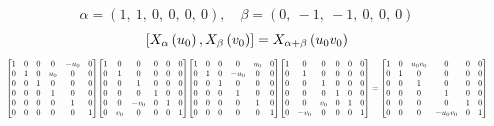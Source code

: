 \documentclass[11pt]{article}
\theoremstyle{definition}
\begin{document}
\[
\alpha = \left( 1, \  1, \  0, \  0, \  0, \  0\right), \quad \beta = \left( 0, \  -1, \  -1, \  0, \  0, \  0\right)
\]
\[
\scaletoalign{\textwidth}{\left[ X_{\alpha}\left(u_{0}\right), X_{\beta}\left(v_{0}\right) \right] = X_{\alpha + \beta}\left(u_{0} v_{0}\right)}
\]
\[
\scaletoalign{\textwidth}{{\left[\begin{matrix}1 & 0 & 0 & 0 & - u_{0} & 0\\0 & 1 & 0 & u_{0} & 0 & 0\\0 & 0 & 1 & 0 & 0 & 0\\0 & 0 & 0 & 1 & 0 & 0\\0 & 0 & 0 & 0 & 1 & 0\\0 & 0 & 0 & 0 & 0 & 1\end{matrix}\right]} {\left[\begin{matrix}1 & 0 & 0 & 0 & 0 & 0\\0 & 1 & 0 & 0 & 0 & 0\\0 & 0 & 1 & 0 & 0 & 0\\0 & 0 & 0 & 1 & 0 & 0\\0 & 0 & - v_{0} & 0 & 1 & 0\\0 & v_{0} & 0 & 0 & 0 & 1\end{matrix}\right]} {\left[\begin{matrix}1 & 0 & 0 & 0 & u_{0} & 0\\0 & 1 & 0 & - u_{0} & 0 & 0\\0 & 0 & 1 & 0 & 0 & 0\\0 & 0 & 0 & 1 & 0 & 0\\0 & 0 & 0 & 0 & 1 & 0\\0 & 0 & 0 & 0 & 0 & 1\end{matrix}\right]} {\left[\begin{matrix}1 & 0 & 0 & 0 & 0 & 0\\0 & 1 & 0 & 0 & 0 & 0\\0 & 0 & 1 & 0 & 0 & 0\\0 & 0 & 0 & 1 & 0 & 0\\0 & 0 & v_{0} & 0 & 1 & 0\\0 & - v_{0} & 0 & 0 & 0 & 1\end{matrix}\right]} = {\left[\begin{matrix}1 & 0 & u_{0} v_{0} & 0 & 0 & 0\\0 & 1 & 0 & 0 & 0 & 0\\0 & 0 & 1 & 0 & 0 & 0\\0 & 0 & 0 & 1 & 0 & 0\\0 & 0 & 0 & 0 & 1 & 0\\0 & 0 & 0 & - u_{0} v_{0} & 0 & 1\end{matrix}\right]}}
\]
\end{document}
